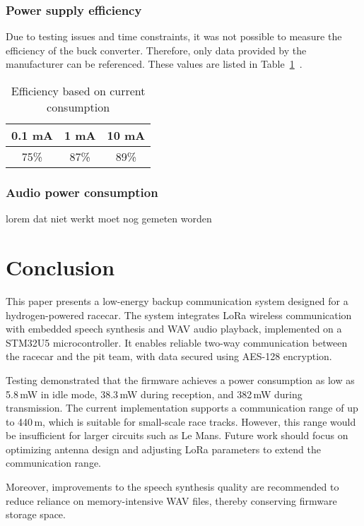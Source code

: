 \documentclass[conference]{IEEEtran}
\begin{document}
\subsubsection{Power supply efficiency}

Due to testing issues and time constraints, it was not possible to measure the efficiency of the buck converter.
Therefore, only data provided by the manufacturer can be referenced. These values are listed in Table~\ref{tab:power_suply_table}~\cite{TPS629203}.

\begin{table}[h]
  \centering
  \caption{Efficiency based on current consumption}
 \label{tab:power_suply_table}
  \begin{tabular}{|c|c|c|}
    \hline
    \textbf{0.1 mA} & \textbf{1 mA} & \textbf{10 mA} \\
    \hline
    75\% & 87\% & 89\% \\
    \hline
  \end{tabular}
\end{table}

\subsubsection{Audio power consumption}

lorem dat niet werkt
moet nog gemeten worden


\section{Conclusion}

This paper presents a low-energy backup communication system designed for a hydrogen-powered racecar. The system integrates LoRa wireless communication with embedded speech synthesis 
and WAV audio playback, implemented on a STM32U5 microcontroller. 
It enables reliable two-way communication between the racecar and the pit team, with data secured using AES-128 encryption.

Testing demonstrated that the firmware achieves a power consumption as low as 5.8\,mW in idle mode, 38.3\,mW during reception, and 382\,mW during transmission. 
The current implementation supports a communication range of up to 440\,m, which is suitable for small-scale race tracks. 
However, this range would be insufficient for larger circuits such as Le Mans. Future work should focus on optimizing antenna design and adjusting LoRa parameters to 
extend the communication range.

Moreover, improvements to the speech synthesis quality are recommended to reduce reliance on memory-intensive WAV files, thereby conserving firmware storage space.
\end{document}
